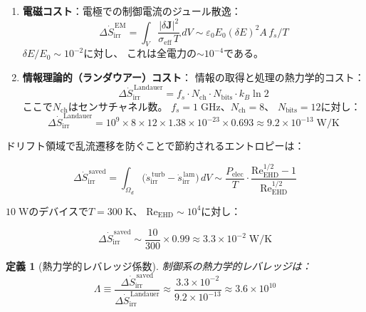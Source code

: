 \documentclass[12pt,twocolumn]{ltjsarticle}
\newtheorem{definition}{定義}
\newcommand{\jj}{\mathbf{J}}
\newcommand{\Sdot}{\dot{S}_{\mathrm{irr}}}
\newcommand{\sdot}{\dot{s}_{\mathrm{irr}}}
\newcommand{\Reehd}{\mathrm{Re}_{\mathrm{EHD}}}
\begin{document}
\begin{enumerate}
  \item \textbf{電磁コスト}：電極での制御電流のジュール散逸：
    \begin{equation}
      \Delta\Sdot^{\,\mathrm{EM}}
      = \int_V \frac{|\delta\jj|^2}{\sigma_{\mathrm{eff}}\,T}\,dV
      \sim \varepsilon_0 E_0 (\delta E)^2 A\,f_s / T
      \label{eq:entropy_EM}
    \end{equation}
    $\delta E / E_0 \sim 10^{-2}$に対し、
    これは全電力の$\sim 10^{-4}$である。

  \item \textbf{情報理論的（ランダウアー）コスト}：
    情報の取得と処理の熱力学的コスト：
    \begin{equation}
      \Delta\Sdot^{\,\mathrm{Landauer}}
      = f_s \cdot N_{\mathrm{ch}} \cdot N_{\mathrm{bits}}
        \cdot k_B \ln 2
      \label{eq:entropy_Landauer}
    \end{equation}
    ここで$N_{\mathrm{ch}}$はセンサチャネル数。
    $f_s = 1\;\mathrm{GHz}$、$N_{\mathrm{ch}} = 8$、
    $N_{\mathrm{bits}} = 12$に対し：
    \begin{equation}
      \Delta\Sdot^{\,\mathrm{Landauer}}
      = 10^9 \times 8 \times 12 \times 1.38 \times 10^{-23}
        \times 0.693
      \approx 9.2 \times 10^{-13}\;\mathrm{W/K}
      \label{eq:landauer_numerical}
    \end{equation}
\end{enumerate}

ドリフト領域で乱流遷移を防ぐことで節約されるエントロピーは：

\begin{equation}
  \Delta\Sdot^{\,\mathrm{saved}}
  = \int_{\Omega_d} \bigl(\sdot^{\,\mathrm{turb}}
    - \sdot^{\,\mathrm{lam}}\bigr)\,dV
  \sim \frac{P_{\mathrm{elec}}}{T}
    \cdot \frac{\Reehd^{1/2} - 1}{\Reehd^{1/2}}
  \label{eq:entropy_saved}
\end{equation}

$10\;\mathrm{W}$のデバイスで$T = 300\;\mathrm{K}$、
$\Reehd \sim 10^4$に対し：

\begin{equation}
  \Delta\Sdot^{\,\mathrm{saved}}
  \sim \frac{10}{300} \times 0.99
  \approx 3.3 \times 10^{-2}\;\mathrm{W/K}
  \label{eq:entropy_saved_num}
\end{equation}

\begin{definition}[熱力学的レバレッジ係数]
\label{def:leverage}
制御系の熱力学的レバレッジは：
\begin{equation}
  \Lambda
  \equiv \frac{\Delta\Sdot^{\,\mathrm{saved}}}
              {\Delta\Sdot^{\,\mathrm{Landauer}}}
  \approx \frac{3.3 \times 10^{-2}}{9.2 \times 10^{-13}}
  \approx 3.6 \times 10^{10}
  \label{eq:leverage}
\end{equation}
\end{definition}
\end{document}
